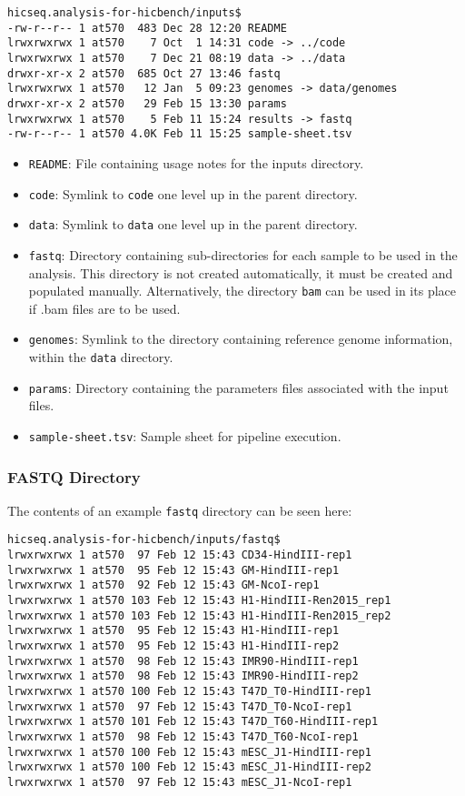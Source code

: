 \begin{lstlisting}
hicseq.analysis-for-hicbench/inputs$
-rw-r--r-- 1 at570  483 Dec 28 12:20 README
lrwxrwxrwx 1 at570    7 Oct  1 14:31 code -> ../code
lrwxrwxrwx 1 at570    7 Dec 21 08:19 data -> ../data
drwxr-xr-x 2 at570  685 Oct 27 13:46 fastq
lrwxrwxrwx 1 at570   12 Jan  5 09:23 genomes -> data/genomes
drwxr-xr-x 2 at570   29 Feb 15 13:30 params
lrwxrwxrwx 1 at570    5 Feb 11 15:24 results -> fastq
-rw-r--r-- 1 at570 4.0K Feb 11 15:25 sample-sheet.tsv
\end{lstlisting}

\begin{itemize}
\item \texttt{README}: File containing usage notes for the inputs directory.
\item \texttt{code}: Symlink to \texttt{code} one level up in the parent directory.
\item \texttt{data}: Symlink to \texttt{data} one level up in the parent directory.
\item \texttt{fastq}: Directory containing sub-directories for each sample to be used in the analysis. This directory is not created automatically, it must be created and populated manually. Alternatively, the directory \texttt{bam} can be used in its place if .bam files are to be used. 
\item \texttt{genomes}: Symlink to the directory containing reference genome information, within the \texttt{data} directory. 
\item \texttt{params}: Directory containing the parameters files associated with the input files. 
\item \texttt{sample-sheet.tsv}: Sample sheet for pipeline execution.
\end{itemize}

\subsubsection{FASTQ Directory}
The contents of an example \texttt{fastq} directory can be seen here:

\begin{lstlisting}
hicseq.analysis-for-hicbench/inputs/fastq$ 
lrwxrwxrwx 1 at570  97 Feb 12 15:43 CD34-HindIII-rep1
lrwxrwxrwx 1 at570  95 Feb 12 15:43 GM-HindIII-rep1
lrwxrwxrwx 1 at570  92 Feb 12 15:43 GM-NcoI-rep1
lrwxrwxrwx 1 at570 103 Feb 12 15:43 H1-HindIII-Ren2015_rep1
lrwxrwxrwx 1 at570 103 Feb 12 15:43 H1-HindIII-Ren2015_rep2
lrwxrwxrwx 1 at570  95 Feb 12 15:43 H1-HindIII-rep1
lrwxrwxrwx 1 at570  95 Feb 12 15:43 H1-HindIII-rep2
lrwxrwxrwx 1 at570  98 Feb 12 15:43 IMR90-HindIII-rep1
lrwxrwxrwx 1 at570  98 Feb 12 15:43 IMR90-HindIII-rep2
lrwxrwxrwx 1 at570 100 Feb 12 15:43 T47D_T0-HindIII-rep1
lrwxrwxrwx 1 at570  97 Feb 12 15:43 T47D_T0-NcoI-rep1
lrwxrwxrwx 1 at570 101 Feb 12 15:43 T47D_T60-HindIII-rep1
lrwxrwxrwx 1 at570  98 Feb 12 15:43 T47D_T60-NcoI-rep1
lrwxrwxrwx 1 at570 100 Feb 12 15:43 mESC_J1-HindIII-rep1
lrwxrwxrwx 1 at570 100 Feb 12 15:43 mESC_J1-HindIII-rep2
lrwxrwxrwx 1 at570  97 Feb 12 15:43 mESC_J1-NcoI-rep1
\end{lstlisting}

